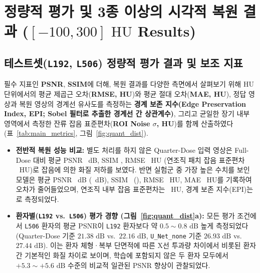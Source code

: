 \documentclass[10pt,a4paper]{article}
\begin{document}
\section{정량적 평가 및 3종 이상의 시각적 복원 결과 ($[-100, 300]\text{ HU}$ Results)}

\subsection{테스트셋(\texttt{L192}, \texttt{L506}) 정량적 평가 결과 및 보조 지표}
필수 지표인 \textbf{PSNR}, \textbf{SSIM}에 더해, 복원 결과를 다양한 측면에서 살펴보기 위해 HU 단위에서의 평균 제곱근 오차(\textbf{RMSE, HU})와 평균 절대 오차(\textbf{MAE, HU}), 정답 영상과 복원 영상의 경계선 유사도를 측정하는 \textbf{경계 보존 지수(Edge Preservation Index, EPI; Sobel 필터로 추출한 경계선 간 상관계수)}, 그리고 균일한 장기 내부 영역에서 측정한 잔류 잡음 표준편차(\textbf{ROI Noise $\sigma$, HU})를 함께 산출하였다(표~\ref{tab:main_metrics}, 그림~\ref{fig:quant_dist}).

\begin{table}[!htbp]
  \centering
  \caption{독립 테스트셋(\texttt{L192}: \TestLOneSlices 장, \texttt{L506}: \TestLFiveSlices 장, 총 \TestSlices 장)에 대한 정량적 성능 비교 요약. ($^\star$: 진행 중인 학습의 최신 검증 체크포인트 스냅샷, $^\dagger$: 에포크 9 \texttt{NaN} 발생 직전 에포크 체크포인트 복구 평가, $^\ddagger$: 에포크 1 내 FP16 AMP 수치 발산)}
  \label{tab:main_metrics}
  \footnotesize
  \resizebox{\linewidth}{!}{}
\end{table}

\begin{itemize}
  \item \textbf{전반적 복원 성능 비교:} 별도 처리를 하지 않은 Quarter-Dose 입력 영상은 Full-Dose 대비 평균 PSNR \BasePSNR\ dB, SSIM \BaseSSIM, RMSE \BaseRMSEHU\ HU (연조직 패치 잡음 표준편차 \BaseNoiseHU\ HU)로 잡음에 의한 화질 저하를 보였다. 반면 실험군 중 가장 높은 수치를 보인 \texttt{\BestRunLabel} 모델은 평균 PSNR \BestPSNR\ dB (\BestPSNRGain\ dB), SSIM \BestSSIM\ (\BestSSIMGain), RMSE \BestRMSEHU\ HU, MAE \BestMAEHU\ HU를 기록하여 오차가 줄어들었으며, 연조직 내부 잡음 표준편차는 \BestNoiseHU\ HU, 경계 보존 지수(EPI)는 \BestEPI 로 측정되었다.
  \item \textbf{환자별(\texttt{L192} vs.\ \texttt{L506}) 평가 경향 (그림~\ref{fig:quant_dist}a):} 모든 평가 조건에서 \texttt{L506} 환자의 평균 PSNR이 \texttt{L192} 환자보다 약 $0.5\sim 0.8\text{ dB}$ 높게 측정되었다(Quarter-Dose 기준 $21.38\text{ dB}$ vs.\ $22.16\text{ dB}$, \texttt{U\_Net\_none} 기준 $26.93\text{ dB}$ vs.\ $27.44\text{ dB}$). 이는 환자 체형·복부 단면적에 따른 X선 투과량 차이에서 비롯된 환자 간 기본적인 화질 차이로 보이며, 학습에 포함되지 않은 두 환자 모두에서 $+5.3\sim +5.6\text{ dB}$ 수준의 비교적 일관된 PSNR 향상이 관찰되었다.
\end{itemize}
\end{document}
